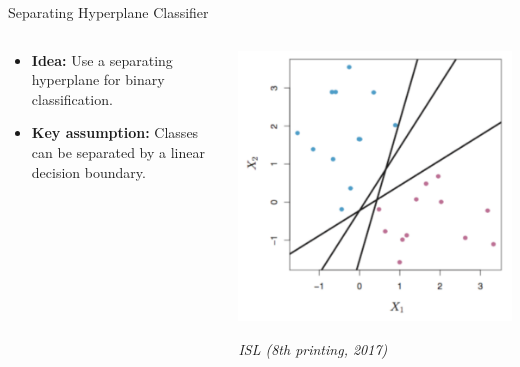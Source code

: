 \begin{frame}{Separating Hyperplane Classifier}
\begin{columns}
  \begin{column}{0.55\textwidth}
    \begin{itemize}
      \item \textbf{Idea:} Use a separating hyperplane for binary classification.
      \item \textbf{Key assumption:} Classes can be separated by a linear decision boundary.
    \end{itemize}
  \end{column}
  \begin{column}{0.45\textwidth}
    \centering
    \includegraphics[width=\linewidth]{images/support-vector-machines/support-vector-machines-4.png}

    {\scriptsize\textit{ISL (8th printing, 2017)}}
  \end{column}
\end{columns}
\end{frame}

